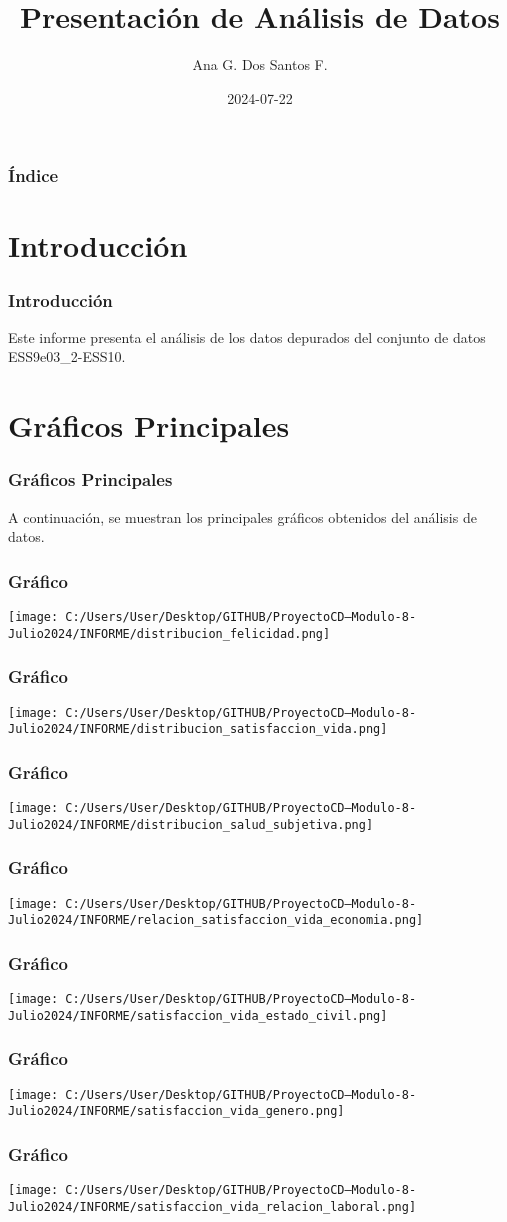 \documentclass{beamer}\usepackage[]{graphicx}\usepackage[]{xcolor}
\title{Presentación de Análisis de Datos}
\author{Ana G. Dos Santos F.}
\date{2024-07-22}
\begin{document}
\begin{frame}
  \titlepage
\end{frame}

\begin{frame}
  \frametitle{Índice}
  \tableofcontents
\end{frame}

\section{Introducción}
\begin{frame}
  \frametitle{Introducción}
  Este informe presenta el análisis de los datos depurados del conjunto de datos ESS9e03\_2-ESS10.
\end{frame}

\section{Gráficos Principales}
\begin{frame}
  \frametitle{Gráficos Principales}
  A continuación, se muestran los principales gráficos obtenidos del análisis de datos.
\end{frame}



\begin{frame}
\frametitle{Gráfico}
\texttt{[image: C:/Users/User/Desktop/GITHUB/ProyectoCD---Modulo-8-Julio2024/INFORME/distribucion\_felicidad.png]}
\end{frame}
\begin{frame}
\frametitle{Gráfico}
\texttt{[image: C:/Users/User/Desktop/GITHUB/ProyectoCD---Modulo-8-Julio2024/INFORME/distribucion\_satisfaccion\_vida.png]}
\end{frame}
\begin{frame}
\frametitle{Gráfico}
\texttt{[image: C:/Users/User/Desktop/GITHUB/ProyectoCD---Modulo-8-Julio2024/INFORME/distribucion\_salud\_subjetiva.png]}
\end{frame}
\begin{frame}
\frametitle{Gráfico}
\texttt{[image: C:/Users/User/Desktop/GITHUB/ProyectoCD---Modulo-8-Julio2024/INFORME/relacion\_satisfaccion\_vida\_economia.png]}
\end{frame}
\begin{frame}
\frametitle{Gráfico}
\texttt{[image: C:/Users/User/Desktop/GITHUB/ProyectoCD---Modulo-8-Julio2024/INFORME/satisfaccion\_vida\_estado\_civil.png]}
\end{frame}
\begin{frame}
\frametitle{Gráfico}
\texttt{[image: C:/Users/User/Desktop/GITHUB/ProyectoCD---Modulo-8-Julio2024/INFORME/satisfaccion\_vida\_genero.png]}
\end{frame}
\begin{frame}
\frametitle{Gráfico}
\texttt{[image: C:/Users/User/Desktop/GITHUB/ProyectoCD---Modulo-8-Julio2024/INFORME/satisfaccion\_vida\_relacion\_laboral.png]}
\end{frame}
\end{document}

